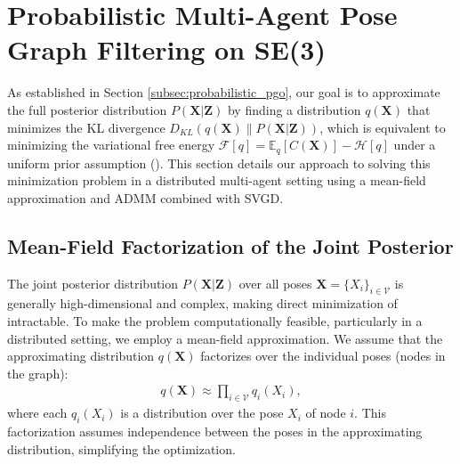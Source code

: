 \section{Probabilistic Multi-Agent Pose Graph Filtering on SE(3)}
\label{sec:probabilistic_pgf}

As established in Section \ref{subsec:probabilistic_pgo}, our goal is to approximate the full posterior distribution $P({\mathbf{X}} | {\mathbf{Z}})$ by finding a distribution $q({\mathbf{X}})$ that minimizes the KL divergence $D_{KL}(q({\mathbf{X}}) \| P({\mathbf{X}} | {\mathbf{Z}}))$, which is equivalent to minimizing the variational free energy ${\mathcal{F}}[q] = \mathbb{E}_q[C({\mathbf{X}})] - {\mathcal{H}}[q]$ under a uniform prior assumption (). This section details our approach to solving this minimization problem in a distributed multi-agent setting using a mean-field approximation and ADMM combined with SVGD.

\subsection{Mean-Field Factorization of the Joint Posterior}
\label{subsec:mean_field}

The joint posterior distribution $P({\mathbf{X}} | {\mathbf{Z}})$ over all poses ${\mathbf{X}} = \{X_i\}_{i \in {\mathcal{V}}}$ is generally high-dimensional and complex, making direct minimization of  intractable. To make the problem computationally feasible, particularly in a distributed setting, we employ a mean-field approximation. We assume that the approximating distribution $q({\mathbf{X}})$ factorizes over the individual poses (nodes in the graph):
\begin{equation}
\begin{aligned}
q({\mathbf{X}}) \approx \prod_{i \in {\mathcal{V}}} q_i(X_i),
\label{eq:mean_field_approx}
\end{aligned}
\end{equation}
where each $q_i(X_i)$ is a distribution over the pose $X_i$ of node $i$. This factorization assumes independence between the poses in the approximating distribution, simplifying the optimization.

